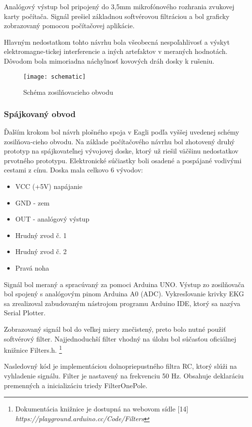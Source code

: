 \documentclass[titlepage,12pt]{article}
\begin{document}
Analógový výstup bol pripojený do 3,5mm mikrofónového rozhrania zvukovej karty počítača. Signál prešiel základnou softvérovou filtráciou a bol graficky zobrazovaný pomocou počítačovej aplikácie.

Hlavným nedostatkom tohto návrhu bola všeobecná nespoľahlivosť a výskyt elektromagne-tickej interferencie a iných artefaktov v meraných hodnotách. Dôvodom bola mimoriadna náchylnosť kovových dráh dosky k rušeniu.


\begin{figure}[!ht]
\begin{center}
\texttt{[image: schematic]}
\caption{Schéma zosilňovacieho obvodu}
\end{center}
\end{figure}

\newpage
\subsubsection{Spájkovaný obvod}
Ďalším krokom bol návrh plošného spoja v Eagli podľa vyššej uvedenej schémy zosilňova-cieho obvodu. Na základe počítačového návrhu bol zhotovený druhý prototyp na spájkovateľnej vývojovej doske, ktorý už riešil väčšinu nedostatkov prvotného prototypu. Elektronické súčiastky boli osadené a pospájané vodivými cestami z cínu. Doska mala celkovo 6 vývodov:
\begin{itemize}
	\item VCC (+5V) napájanie
	\item GND - zem
	\item OUT - analógový výstup
	\item Hrudný zvod č. 1
	\item Hrudný zvod č. 2
	\item Pravá noha
\end{itemize}

Signál bol meraný a spracúvaný za pomoci Arduina UNO. Výstup zo zosilňovača bol spojený s analógovým pinom Arduina A0 (ADC). Vykresľovanie krivky EKG sa zrealizoval zabudovaným nástrojom programu Arduino IDE, ktorý sa nazýva Serial Plotter.

Zobrazovaný signál bol do veľkej miery znečistený, preto bolo nutné použiť softvérový filter. Najjednoduchší filter vhodný na úlohu bol súčasťou oficiálnej knižnice Filters.h. \footnote{Dokumentácia knižnice je dostupná na webovom sídle [14] \textit{https://playground.arduino.cc/Code/Filters}}

Nasledovný kód je implementáciou dolnopriepustného filtra RC, ktorý slúži na vyhladenie signálu. Filter je nastavený na frekvenciu 50 Hz. Obsahuje deklaráciu premenných a inicializáciu triedy FilterOnePole.
\end{document}
